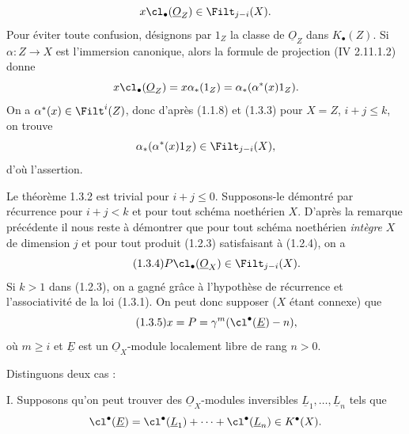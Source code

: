 
\[
x\cl_\bullet(\underline{O}_Z)\in\Filt_{j-i}(X).
\]
Pour éviter toute confusion, désignons par $1_Z$ la classe de $\underline{O}_Z$ dans $K_\bullet(Z)$. Si $\alpha:Z\to X$ est l'immersion canonique, alors la formule de projection (IV 2.11.1.2) donne
\[
x\cl_\bullet(\underline{O}_Z)=x\alpha_*(1_Z)=\alpha_*(\alpha^*(x)1_Z).
\]
On a $\alpha^*(x)\in\Filt^i(Z)$, donc d'après (1.1.8) et (1.3.3) pour $X=Z$, $i+j\leq k$, on trouve
\[
\alpha_*(\alpha^*(x)1_Z)\in\Filt_{j-i}(X),
\]
d'où l'assertion.

Le théorème 1.3.2 est trivial pour $i+j\leq0$. Supposons-le démontré par récurrence pour $i+j<k$ et pour tout schéma noethérien $X$. D'après la remarque précédente il nous reste à démontrer que pour tout schéma noethérien \emph{intègre} $X$ de dimension $j$ et pour tout produit (1.2.3) satisfaisant à (1.2.4), on a
\begin{equation}\tag{1.3.4}
P\cl_\bullet(\underline{O}_X)\in\Filt_{j-i}(X).
\end{equation}
Si $k>1$ dans (1.2.3), on a gagné grâce à l'hypothèse de récurrence et l'associativité de la loi (1.3.1). On peut donc supposer ($X$ étant connexe) que
\begin{equation}\tag{1.3.5}
x=P=\gamma^m(\cl^{\bullet}(\underline{E})-n),
\end{equation}
où $m\geq i$ et $\underline{E}$ est un $\underline{O}_X$-module localement libre de rang $n>0$.

Distinguons deux cas :

I. Supposons qu'on peut trouver des $\underline{O}_X$-modules inversibles $\underline{L}_1,\ldots,\underline{L}_n$ tels que
\[
\cl^{\bullet}(\underline{E})=\cl^{\bullet}(\underline{L}_1)+\cdots+\cl^{\bullet}(\underline{L}_n)\in K^{\bullet}(X).
\]
